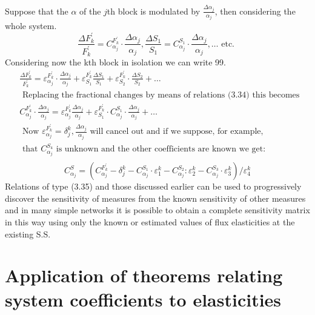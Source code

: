 Suppose that the $\alpha$ of the $j$th block is modulated by $\frac{\Delta \alpha_{j}}{\alpha_{j}}$, then considering the whole system.
%
\begin{equation}
\frac{\Delta F_{k}^{\prime}}{F_{k}^{\prime}}= C_{\alpha_{j}}^{F_{k}^{\prime}} \cdot \frac{\Delta \alpha_{j}}{\alpha_{j}}, \frac{\Delta S_{1}}{S_{1}}=C_{\alpha_{j}}^{S_{1}} \cdot \frac{\Delta \alpha_{j}}{\alpha_{j}}, \ldots \text { etc. }
\label{eqn:334}
\end{equation}
%
Considering now the kth block in isolation we can write 99.
%
$$
\begin{aligned}
& \frac{\Delta F_{k}^{\prime}}{F_{k}^{\prime}}= \varepsilon_{\alpha_{j}}^{F_{k}^{\prime}} \cdot \frac{\Delta \alpha_{j}}{\alpha_{j}} + \varepsilon_{S_{1}}^{F_{k}^{\prime}} \frac{\Delta S_{1}}{S_{1}} + \varepsilon_{S_{2}}^{F_{k}^{\prime}} \cdot \frac{\Delta S_{2}}{S_{2}}+\ldots \\
& \text { Replacing the fractional changes by means of relations (3.34) this becomes } \\
& C_{\alpha_{j}}^{F_{k}^{\prime}} \cdot \frac{\Delta \alpha_{j}}{\alpha_{j}}=\varepsilon_{\alpha_{j}}^{F_{k}^{\prime}} \frac{\Delta \alpha_{j}}{\alpha_{j}}+ \varepsilon_{S_{1}}^{F_{k}^{\prime}} \cdot C_{\alpha_{j}}^{S_{1}} \cdot \frac{\Delta \alpha_{j}}{\alpha_{j}}+\ldots \\
& \text { Now } \varepsilon_{\alpha_{j}}^{F_{k}^{\prime}}=\delta_{j}^{k}, \frac{\Delta \alpha_{j}}{\alpha_{j}} \text { will cancel out and if we suppose, for example, } \\
& \text { that } C_{\alpha_{j}}^{S_{4}} \text { is unknown and the other coefficients are known we get: } \\
\end{aligned}
$$
%
\begin{equation}
C_{\alpha_{j}}^{S}=\left(C_{\alpha_{j}}^{F_{k}^{\prime}}-\delta_{j}^{k}- C_{\alpha_{j}}^{S_{1}} \cdot \varepsilon_{1}^{k}- C_{\alpha_{j}}^{S_{2}}: \varepsilon_{2}^{k}- C_{\alpha_{j}}^{S_{3}} \cdot \varepsilon_{3}^{k}\right) / \varepsilon_{4}^{k}
\label{eqn:335}
\end{equation}
%
Relations of type (3.35) and those discussed earlier can be used to progressively discover the sensitivity of measures from the known sensitivity of other measures and in many simple networks it is possible to obtain a complete sensitivity matrix in this way using only the known or estimated values of flux elasticities at the existing S.S.

\section{Application of theorems relating system coefficients to elasticities}

